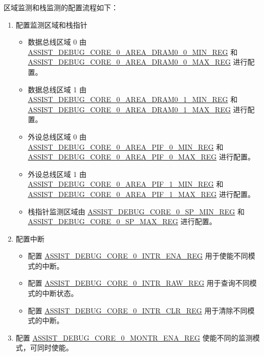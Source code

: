 \documentclass[main\_\_CN.tex]{subfiles}
\begin{document}
区域监测和栈监测的配置流程如下：
\begin{enumerate}
    \item 配置监测区域和栈指针
        \begin{itemize}
            \item 数据总线区域 0 由 \hyperref[regdesc:ASSISTDEBUGCORE0AREADRAM00MINREG]{ASSIST\_DEBUG\_CORE\_0\_AREA\_DRAM0\_0\_MIN\_REG} 和\\ \hyperref[regdesc:ASSISTDEBUGCORE0AREADRAM00MAXREG]{ASSIST\_DEBUG\_CORE\_0\_AREA\_DRAM0\_0\_MAX\_REG} 进行配置。
            \item 数据总线区域 1 由 \hyperref[regdesc:ASSISTDEBUGCORE0AREADRAM01MINREG]{ASSIST\_DEBUG\_CORE\_0\_AREA\_DRAM0\_1\_MIN\_REG} 和\\ \hyperref[regdesc:ASSISTDEBUGCORE0AREADRAM01MAXREG]{ASSIST\_DEBUG\_CORE\_0\_AREA\_DRAM0\_1\_MAX\_REG} 进行配置。
            \item 外设总线区域 0 由 \hyperref[regdesc:ASSISTDEBUGCORE0AREAPIF0MINREG]{ASSIST\_DEBUG\_CORE\_0\_AREA\_PIF\_0\_MIN\_REG} 和\\ \hyperref[regdesc:ASSISTDEBUGCORE0AREAPIF0MAXREG]{ASSIST\_DEBUG\_CORE\_0\_AREA\_PIF\_0\_MAX\_REG} 进行配置。
            \item 外设总线区域 1 由 \hyperref[regdesc:ASSISTDEBUGCORE0AREAPIF1MINREG]{ASSIST\_DEBUG\_CORE\_0\_AREA\_PIF\_1\_MIN\_REG} 和\\ \hyperref[regdesc:ASSISTDEBUGCORE0AREAPIF1MAXREG]{ASSIST\_DEBUG\_CORE\_0\_AREA\_PIF\_1\_MAX\_REG} 进行配置。
            \item 栈指针监测区域由 \hyperref[regdesc:ASSISTDEBUGCORE0SPMINREG]{ASSIST\_DEBUG\_CORE\_0\_SP\_MIN\_REG} 和\\ \hyperref[regdesc:ASSISTDEBUGCORE0SPMAXREG]{ASSIST\_DEBUG\_CORE\_0\_SP\_MAX\_REG} 进行配置。
        \end{itemize}
    \item 配置中断
    \begin{itemize}
        \item 配置 \hyperref[regdesc:ASSISTDEBUGCORE0INTRENAREG]{ASSIST\_DEBUG\_CORE\_0\_INTR\_ENA\_REG} 用于使能不同模式的中断。
        \item 配置 \hyperref[regdesc:ASSISTDEBUGCORE0INTRRAWREG]{ASSIST\_DEBUG\_CORE\_0\_INTR\_RAW\_REG} 用于查询不同模式的中断状态。
        \item 配置 \hyperref[regdesc:ASSISTDEBUGCORE0INTRCLRREG]{ASSIST\_DEBUG\_CORE\_0\_INTR\_CLR\_REG} 用于清除不同模式的中断。
        \end{itemize}
    \item 配置 \hyperref[regdesc:ASSISTDEBUGCORE0MONTRENAREG]{ASSIST\_DEBUG\_CORE\_0\_MONTR\_ENA\_REG} 使能不同的监测模式，可同时使能。
\end{enumerate}
\end{document}

